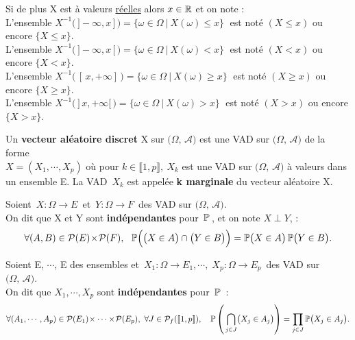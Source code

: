 Si de plus X est à valeurs \underline{réelles} alors \(x\in \mathbb{R}\) et on note :\vspace{0.1cm}\\
L'ensemble \(X^{-1}\bigl(\,]-\infty,x\,]\,\bigr)=\{\omega\in \Omega \ \rvert \ X(\omega)\leq x\}\;\) est noté \((X\leq x)\) ou encore \(\{X\leq x\}\).\vspace{0.1cm}\\
L'ensemble \(X^{-1}\bigl(\,]-\infty,x\,[\,\bigr)=\{\omega\in \Omega \ \rvert \ X(\omega)< x\}\;\) est noté \((X< x)\) ou encore \(\{X< x\}\).\vspace{0.1cm}\\
L'ensemble \(X^{-1}\bigl(\,[\,x,+\infty]\,\bigr)=\{\omega\in \Omega \ \rvert \ X(\omega)\geq x\}\;\) est noté \((X\geq x)\) ou encore \(\{X\geq x\}\).\vspace{0.1cm}\\
L'ensemble \(X^{-1}\bigl(\,]\,x,+\infty[\,\bigr)=\{\omega\in \Omega \ \rvert \ X(\omega)> x\}\;\) est noté \((X> x)\) ou encore \(\{X> x\}\).

\vspace{1.6cm}

Un \textbf{vecteur aléatoire discret} X sur \(\bigl(\Omega,\,\mathcal{A}\bigr)\) est une VAD sur \(\bigl(\Omega,\,\mathcal{A}\bigr)\) de la forme\\
\(X=(X_1,\cdots,X_p)\) où pour \(k\in \llbracket 1,p \rrbracket,\ X_k\) est une VAD sur \(\bigl(\Omega,\,\mathcal{A}\bigr)\) à valeurs dans un ensemble E. La VAD \(\,X_k\) est appelée \textbf{k marginale} du vecteur aléatoire X.

\vspace{1.5cm}

Soient \(\,X:\Omega \to E\,\) et \(\,Y:\Omega \to F\,\) des VAD sur \(\bigl(\Omega,\,\mathcal{A}\bigr)\).\\
On dit que X et Y sont \textbf{indépendantes} pour \(\,\mathbb{P}\,\), et on note \(X\perp Y\), \ssi :\vspace{-0.25cm}
\[\forall (A,B)\in \mathcal{P}(E)\!\times\! \mathcal{P}(F),\ \ \mathbb{P}\Bigl(\bigl(X\in A\bigr)\cap \bigl(Y\in B\bigr)\Bigr)=\mathbb{P}\bigl(X\in A\bigr)\,\mathbb{P}\bigl(Y\in B\bigr).\]

\vspace{1.3cm}

Soient E, $\cdots$, E des ensembles et \(\,X_1:\Omega \to E_1 , \cdots,\; X_p: \Omega \to E_p\,\) des VAD sur \(\bigl(\Omega,\,\mathcal{A}\bigr)\).\\
On dit que \(X_1,\cdots,X_p\) sont \textbf{indépendantes} pour \(\,\mathbb{P}\,\) \ssi :\vspace{-0.3cm}
\[\forall (A_1,\cdots,A_p)\in\mathcal{P}(E_1)\!\times\cdots\times\! \mathcal{P}(E_p),\ \forall J\in \mathcal{P}_f(\llbracket 1,p \rrbracket),\quad \mathbb{P}\left(\,\bigcap_{j\in J}\bigl(X_j\in A_j\bigr) \right)=\prod_{j\in J}\mathbb{P}\bigl(X_j\in A_j\bigr).\]

